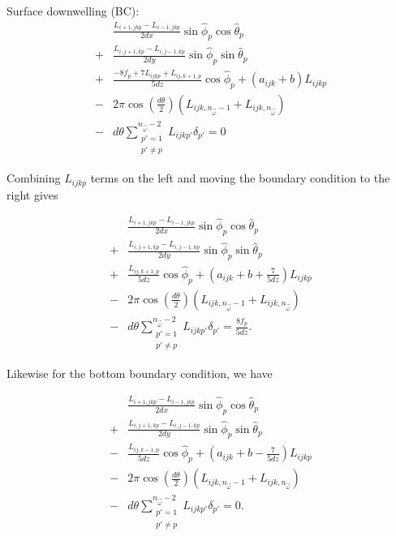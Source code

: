 Surface downwelling (BC):
\begin{equation*}
  \begin{aligned}
    &\frac{L_{i+1,jkp}-L_{i-1,jkp}}{2dx}\sin\hat{\phi}_p\cos\hat{\theta}_p \\
    + &\frac{L_{i,j+1,kp}-L_{i,j-1,kp}}{2dy}\sin\hat{\phi}_p\sin\hat{\theta}_p \\
    + &\frac{-8f_p + 7L_{ijkp} + L_{ij,k+1,p}}{5dz}\cos\hat{\phi}_p  + (a_{ijk}+b)L_{ijkp} \\
    - &2\pi\cos\left( \frac{d\theta}{2} \right)(L_{ijk,n_{\vec{\omega}}-1}+L_{ijk,n_{\vec{\omega}}}) \\
    - &d\theta \sum_{\substack{p'=1 \\ p' \neq p}}^{n_{\vec{\omega}}-2} L_{ijkp'}\delta_{p'} = 0
  \end{aligned}
\end{equation*}

Combining $L_{ijkp}$ terms on the left and moving the boundary condition to the
right gives

\begin{equation}
  \begin{aligned}
    &\frac{L_{i+1,jkp}-L_{i-1,jkp}}{2dx}\sin\hat{\phi}_p\cos\hat{\theta}_p \\
    + &\frac{L_{i,j+1,kp}-L_{i,j-1,kp}}{2dy}\sin\hat{\phi}_p\sin\hat{\theta}_p \\
    + &\frac{L_{ij,k+1,p}}{5dz}\cos\hat{\phi}_p + (a_{ijk} + b +\frac{7}{5dz})L_{ijkp} \\
    - &2\pi\cos\left( \frac{d\theta}{2} \right)(L_{ijk,n_{\vec{\omega}}-1}+L_{ijk,n_{\vec{\omega}}}) \\
    - &d\theta \sum_{\substack{p'=1 \\ p' \neq p}}^{n_{\vec{\omega}}-2} L_{ijkp'}\delta_{p'} = \frac{8f_p}{5dz}.
  \end{aligned}
\end{equation}

Likewise for the bottom boundary condition, we have

\begin{equation}
  \begin{aligned}
    &\frac{L_{i+1,jkp}-L_{i-1,jkp}}{2dx}\sin\hat{\phi}_p\cos\hat{\theta}_p \\
    + &\frac{L_{i,j+1,kp}-L_{i,j-1,kp}}{2dy}\sin\hat{\phi}_p\sin\hat{\theta}_p \\
    - &\frac{L_{ij,k-1,p}}{5dz}\cos\hat{\phi}_p + (a_{ijk} + b -\frac{7}{5dz})L_{ijkp} \\
    - &2\pi\cos\left( \frac{d\theta}{2} \right)(L_{ijk,n_{\vec{\omega}}-1}+L_{ijk,n_{\vec{\omega}}}) \\
    - &d\theta \sum_{\substack{p'=1 \\ p' \neq p}}^{n_{\vec{\omega}}-2} L_{ijkp'}\delta_{p'} = 0.
  \end{aligned}
\end{equation}

